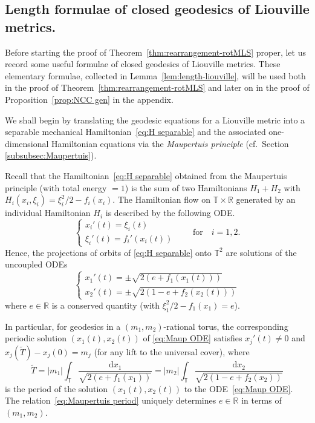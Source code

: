 \documentclass[11pt,letterpaper,oneside]{amsart}
\newcommand{\R}{\mathbb{R}}
\newcommand{\T}{\mathbb{T}}
\theoremstyle{definition}
\theoremstyle{remark}
\newcommand{\wt}{\widetilde}
\theoremstyle{definition}
\theoremstyle{remark}
\newcommand{\dif}{\mathrm{d}}
\begin{document}
\subsection{Length formulae of closed geodesics of Liouville metrics.}

Before starting the proof of Theorem~\ref{thm:rearrangement-rotMLS} proper, let us record some useful formulae of closed geodesics of Liouville metrics.
These elementary formulae, collected in Lemma~\ref{lem:length-liouville}, will be used both in the proof of Theorem~\ref{thm:rearrangement-rotMLS} and later on in the proof of Proposition~\ref{prop:NCC gen} in the appendix.

\medskip

We shall begin by translating the geodesic equations for a Liouville metric into a separable mechanical Hamiltonian~\eqref{eq:H separable} and the associated one-dimensional Hamiltonian equations via the \emph{Maupertuis principle} (cf.~Section \ref{subsubsec:Maupertuis}). 




\medskip

Recall that the Hamiltonian~\eqref{eq:H separable} obtained from the Maupertuis principle (with total energy $= 1$) is the sum of two Hamiltonians $H_1 + H_2$ with $H_i(x_i, \xi_i) = \xi_i^2/2 - f_i(x_i)$.
The Hamiltonian flow on $\T \times \R$ generated by an individual Hamiltonian $H_i$ is described by the following ODE.
\begin{equation} \label{eq:separableODE}
    \begin{cases}
        x_i'(t) = \xi_i(t) \\
        \xi_i'(t) = f_i'(x_i(t))
    \end{cases} \qquad \text{for} \quad i = 1,2.
\end{equation}
Hence, the projections of orbits of \eqref{eq:H separable} onto $\T^2$ are solutions of the uncoupled ODEs
\begin{equation}\label{eq:Maup ODE}
    \begin{cases}
        x_1'(t) = \pm \sqrt{2(e + f_1(x_1(t)))} \\
        x_2'(t) = \pm \sqrt{2(1 - e + f_2(x_2(t)))}
    \end{cases} 
\end{equation}
where $e \in \R$ is a conserved quantity (with $\xi_1^2/2 - f_1(x_1) = e$).

\medskip

In particular, for geodesics in a $(m_1, m_2)$-rational torus, the corresponding periodic solution $(x_1(t), x_2(t))$ of \eqref{eq:Maup ODE} satisfies $x_j'(t) \neq 0$ and $x_j(\wt T) - x_j(0) = m_j$ (for any lift to the universal cover), where
\begin{equation}\label{eq:Maupertuis period}
    \wt T = |m_1|\int_{\T} \frac{\dif x_1}{\sqrt{2 (e + f_1(x_1))}} = |m_2|\int_{\T} \frac{\dif x_2}{\sqrt{2 ( 1 - e + f_2(x_2))}} 
\end{equation}
is the period of the solution $(x_1(t), x_2(t))$ to the ODE~\eqref{eq:Maup ODE}.
The relation~\eqref{eq:Maupertuis period} uniquely determines $e \in \R$ in terms of $(m_1, m_2)$.
\end{document}
